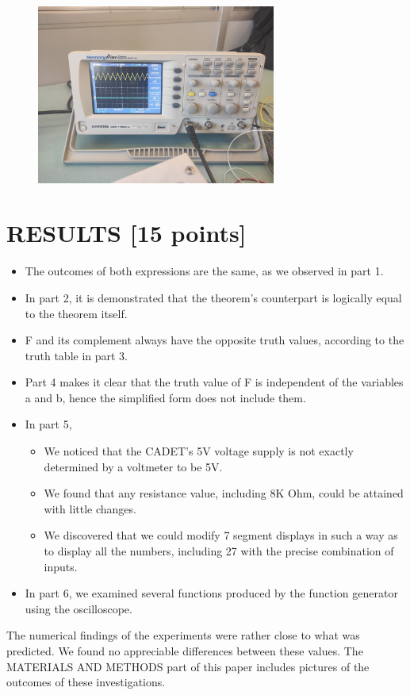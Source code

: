 \documentclass[pdftex,12pt,a4paper]{article}
\begin{document}
\begin{figure}[H]
	\centering
	\includegraphics[width=0.7\textwidth]{ex6-7.png}
	\caption{}
	\label{fig14}
\end{figure}

\section{RESULTS [15 points]}
\begin{itemize}
    \item The outcomes of both expressions are the same, as we observed in part 1.
    \item In part 2, it is demonstrated that the theorem's counterpart is logically equal to the theorem itself.
    \item F and its complement always have the opposite truth values, according to the truth table in part 3.
    \item Part 4 makes it clear that the truth value of F is independent of the variables a and b, hence the simplified form does not include them.
    \item In part 5,
    \begin{itemize}
        \item We noticed that the CADET's 5V voltage supply is not exactly determined by a voltmeter to be 5V.
        \item We found that any resistance value, including 8K Ohm, could be attained with little changes.
        \item We discovered that we could modify 7 segment displays in such a way as to display all the numbers, including 27 with the precise combination of inputs.
    \end{itemize}
    \item In part 6, we examined several functions produced by the function generator using the oscilloscope.
\end{itemize}
The numerical findings of the experiments were rather close to what was predicted. We found no appreciable differences between these values. The MATERIALS AND METHODS part of this paper includes pictures of the outcomes of these investigations.
\end{document}
